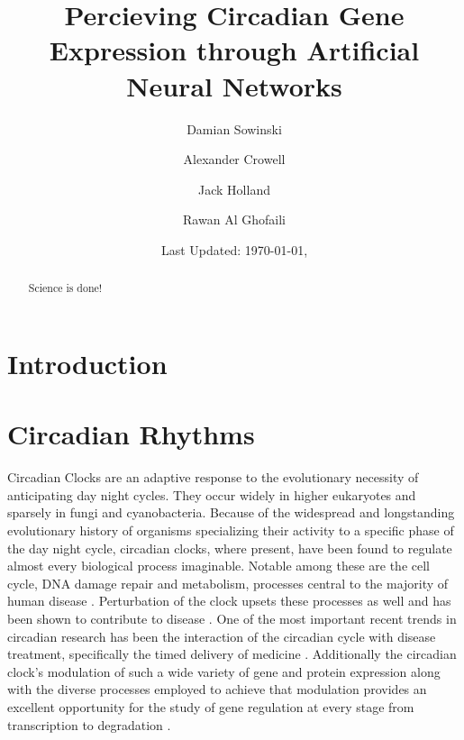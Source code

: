 \documentclass[prl,amsmath,amssymb,floatfix,superscriptaddress,notitlepage,twocolumn]{revtex4}
\begin{document}
\title{Percieving Circadian Gene Expression through Artificial Neural Networks}

\author{Damian Sowinski}

\author{Alexander Crowell}

\author{Jack Holland}

\author{Rawan Al Ghofaili}


\date{Last Updated: \today, \currenttime}

\begin{abstract}

Science is done!

\end{abstract}

\maketitle

\section{Introduction}

\section{Circadian Rhythms}
Circadian Clocks are an adaptive response to the evolutionary necessity of anticipating day night cycles.  They occur widely in higher eukaryotes and sparsely in fungi and cyanobacteria.  Because of the widespread and longstanding evolutionary history of organisms specializing their activity to a specific phase of the day night cycle, circadian clocks, where present, have been found to regulate almost every biological process imaginable.  Notable among these are the cell cycle, DNA damage repair and metabolism, processes central to the majority of human disease \cite{Dunlap99}.  Perturbation of the clock upsets these processes as well and has been shown to contribute to disease \cite{Bass10}.  One of the most important recent trends in circadian research has been the interaction of the circadian cycle with disease treatment, specifically the timed delivery of medicine \cite{Zhang14}.  Additionally the circadian clock's modulation of such a wide variety of gene and protein expression along with the diverse processes employed to achieve that modulation provides an excellent opportunity for the study of gene regulation at every stage from transcription to degradation \cite{Mehra09,Menet14}.
\end{document}
